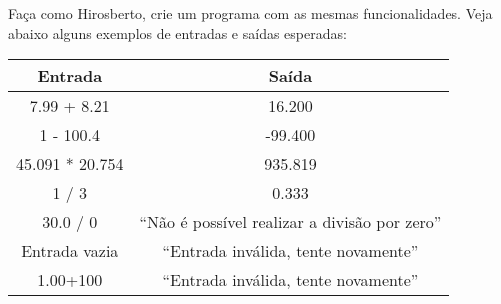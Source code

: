 \documentclass[12pt]{article}
\begin{document}
Faça como Hirosberto, crie um programa com as mesmas funcionalidades.
Veja abaixo alguns exemplos de entradas e saídas esperadas:

\begin{center}
    \begin{tabular}{c | c}
        \hline
        \textbf{Entrada} & \textbf{Saída}                                 \\
        \hline
        7.99 + 8.21      & 16.200                                         \\
        1 - 100.4        & -99.400                                        \\
        45.091 * 20.754  & 935.819                                        \\
        1 / 3            & 0.333                                          \\
        30.0 / 0         & ``Não é possível realizar a divisão por zero'' \\
        Entrada vazia    & ``Entrada inválida, tente novamente''          \\
        1.00+100         & ``Entrada inválida, tente novamente''          \\

        \hline
    \end{tabular}
\end{center}
\end{document}
